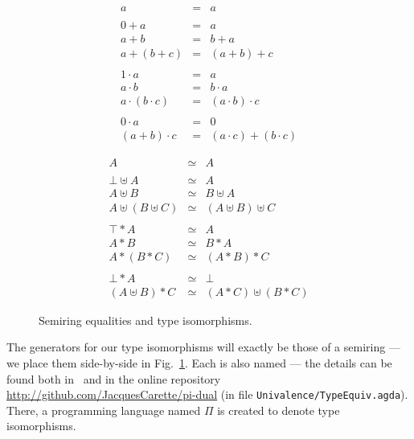 \documentclass[sigplan,review,anonymous]{acmart}
\newcommand{\presumtype}{\uplus}
\newcommand{\preprodtype}{*}
\begin{document}
\begin{figure}[t]
\begin{minipage}{0.48\textwidth}
\[\begin{array}{rcl}
a &=& a \\
\\
0 + a &=& a \\
a + b &=& b + a \\
a + (b + c) &=& (a + b) + c \\
\\
1 \cdot a &=& a \\
a \cdot b &=& b \cdot a \\
a \cdot (b \cdot c) &=& (a \cdot b) \cdot c \\
\\
0 \cdot a &=& 0 \\
(a + b) \cdot c &=& (a \cdot c) + (b \cdot c)
\end{array}\]
\end{minipage}
\begin{minipage}{0.48\textwidth}
\[
\begin{array}{rrcll}
& A & \simeq & A &\\
\\
&  \bot \presumtype A & \simeq & A &\\
&  A \presumtype B & \simeq & B \presumtype A &\\
&  A \presumtype (B \presumtype C) & \simeq & (A \presumtype B) \presumtype C &\\
\\
&  \top \preprodtype A & \simeq & A &\\
&  A \preprodtype B & \simeq & B \preprodtype A &\\
&  A \preprodtype (B \preprodtype C) & \simeq & (A \preprodtype B) \preprodtype C &\\
\\
& \bot \preprodtype A & \simeq & \bot &\\
& (A \presumtype B) \preprodtype C & \simeq & (A \preprodtype C) \presumtype (B \preprodtype C) &
\end{array}
\]
\end{minipage}
\caption{Semiring equalities and type isomorphisms.}
\label{type-isos}
\end{figure}

The generators for our type isomorphisms will exactly be those
of a semiring --- we place them side-by-side in
Fig.~\ref{type-isos}.  Each is also named --- the details can be found
both in~\cite{Carette2016,Carette2018} and in the online repository
\url{http://github.com/JacquesCarette/pi-dual} (in file
\texttt{Univalence/TypeEquiv.agda}).  There, a programming
language named $\Pi$ is created to denote type isomorphisms.
\end{document}
